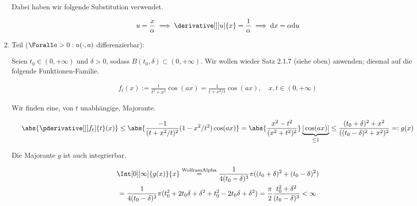 \begin{solution}
\begin{enumerate}[label = \arabic*.]
    Dabei haben wir folgende Substitution verwendet.

    \begin{align*}
        u = \frac{x}{\alpha}
        \implies
        \derivative[][u]{x} = \frac{1}{\alpha}
        \implies
        \mathrm{d}x = \alpha \mathrm{d}u
    \end{align*}

    \item Teil ($\Forall a > 0: u(\cdot, a)$ differenzierbar):
    
    Seien $t_0 \in (0, +\infty)$ und $\delta > 0$, sodass $B(t_0, \delta) \subset (0, +\infty)$.
    Wir wollen wieder Satz 2.1.7 (siehe oben) anwenden; diesmal auf die folgende Funktionen-Familie.

    \begin{align*}
        f_t(x)
        :=
        \frac{t}{t^2 + x^2}
        \cos(a x)
        =
        \frac{1}{t + x^2 / t}
        \cos(a x),
        \quad
        x, t \in (0, +\infty)
    \end{align*}

    Wir finden eine, von $t$ unabhängige, Majorante.

    \begin{align*}
        \abs
        {
            \pderivative[][f_t]{t}(x)
        }
        \leq
        \abs
        {
            \frac{-1}{(t + x^2 / t)^2}
            (1 - x^2 / t^2)
            \cos(a x)
        }
        =
        \abs
        {
            \frac{x^2 - t^2}{(x^2 + t^2)^2}
        }
        \underbrace{|\cos(a x)|}_{\leq 1}
        \leq
        \frac
        {
            (t_0 + \delta)^2 + x^2
        }{
            ((t_0 - \delta)^2 + x^2)^2
        }
        =:
        g(x)
    \end{align*}

    Die Majorante $g$ ist auch integrierbar.

    \begin{multline*}
        \Int[0][\infty]{g(x)}{x}
        \stackrel
        {
            \mathrm{WolframAlpha}
        }{=}
        \frac{1}{4 (t_0 - \delta)^3}
        \pi
        (
            (t_0 + \delta)^2
            +
            (t_0 - \delta)^2
        ) \\
        =
        \frac{1}{4 (t_0 - \delta)^3}
        \pi
        (
            t_0^2 + 2 t_0 \delta + \delta^2
            +
            t_0^2 - 2 t_0 \delta + \delta^2
        )
        =
        \frac{\pi}{2}
        \frac{t_0^2 + \delta^2}{(t_0 - \delta)^3}
        <
        \infty
    \end{multline*}


\end{enumerate}
\end{solution}
